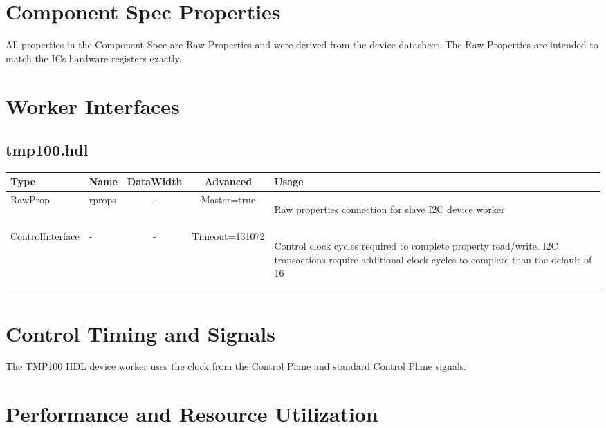 \documentclass{article}
\def\comp{tmp100}
\def\Comp{TMP100}
\begin{document}
\begin{landscape}
\section*{Component Spec Properties}
All properties in the Component Spec are Raw Properties and were derived from the device datasheet\cite{datasheet}. The Raw Properties are intended to match the ICs hardware registers exactly.
	\section*{Worker Interfaces}
	\subsection*{\comp.hdl}
	\begin{scriptsize}
		\begin{tabular}{|M{2cm}|M{1.5cm}|c|c|M{12cm}|}
			\hline
			Type & Name & DataWidth & Advanced & Usage \\
			\hline
			RawProp
			& rprops
			& -
			& Master=true
			& \begin{flushleft}Raw properties connection for slave I2C device worker\end{flushleft}\\
			\hline
			ControlInterface
			& -
			& -
			& Timeout=131072
			& \begin{flushleft}Control clock cycles required to complete property  read/write. I2C transactions require additional clock cycles to complete than the default of 16 \end{flushleft}\\
			\hline
		\end{tabular}
	\end{scriptsize}
\end{landscape}

\section*{Control Timing and Signals}
The \Comp{} HDL device worker uses the clock from the Control Plane and standard Control Plane signals.

\section*{Performance and Resource Utilization}
\end{document}
